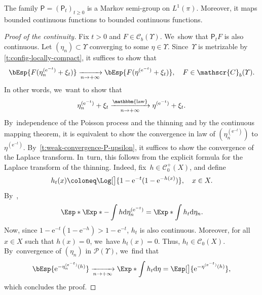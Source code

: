 \documentclass[JEP,XML,SOM,Unicode,published]{cedram}
\theoremstyle{definition}
\theoremstyle{remark}
\DeclareMathOperator{\law}{\mathbbm{law}}
\begin{document}
The family $\mathsf{P} = (\mathsf{P}_{t})_{t \ge 0}$ is a Markov semi-group on $L^{1}(\pi)$.
Moreover, it maps bounded continuous functions to bounded continuous functions.
\begin{proof}[Proof of the continuity]
Fix $t > 0$ and $F \in \mathscr{C}_{b}(\Upsilon)$. We~show that $\mathsf{P}_{t}F$ is also continuous.
Let $(\eta_{n}) \subset \varUpsilon$ converging to some $\eta \in \varUpsilon$.
Since~$\varUpsilon$ is metrizable by \cref{t:config-locally-compact}, it suffices to show that
\begin{equation*}
\bEsp{F(\eta_{n}^{(\mathrm{e}^{-t})} + \xi_{t})} \xrightarrow[n \to +\infty]{} \bEsp{F(\eta^{(\mathrm{e}^{-t})} + \xi_{t})}, \quad F \in \mathscr{C}_{b}(\varUpsilon).
\end{equation*}
In other words, we~want to show that
\begin{equation*}
\eta_{n}^{(\mathrm{e}^{-t})} + \xi_{t} \xrightarrow[n \to +\infty]{\law} \eta^{(\mathrm{e}^{-t})} + \xi_{t}.
\end{equation*}
By~independence of the Poisson process and the thinning and by the continuous mapping theorem, it is equivalent to show the convergence in law of $(\eta_{n}^{(\mathrm{e}^{-t})})$ to $\eta^{(\mathrm{e}^{-t})}$.
By~\cref{t:weak-convergence-P-upsilon}, it suffices to show the convergence of the Laplace transform.
In~turn, this follows from the explicit formula for the Laplace transform of the thinning.
Indeed, fix~$h \in \mathscr{C}_{0}^{+}(X)$, and define
\begin{equation*}
h_{t}(x) \coloneq \Log[\big]{ 1 - \mathrm{e}^{-t} (1-\mathrm{e}^{-h(x)})}, \quad x \in X.
\end{equation*}
By~\cite[Lem.\,3.1(iv)]{Kallenberg},
\begin{equation*}
\Esp*{ \Exp*{- \int h \mathrm{d} \eta_{n}^{(\mathrm{e}^{-t})}} } = \Exp*{ \int h_{t} \mathrm{d} \eta_{n} }.
\end{equation*}
Now, since $1 - \mathrm{e}^{-t}(1-\mathrm{e}^{-h}) > 1 - \mathrm{e}^{-t}$, $h_{t}$ is also continuous.
Moreover, for all $x \in X$ such that $h(x) = 0$, we~have $h_{t}(x) = 0$.
Thus, $h_{t} \in \mathscr{C}_{0}(X)$.
By~convergence of $(\eta_{n})$ in $\mathscr{P}(\varUpsilon)$, we~find that
\begin{equation*}
\bEsp{ \mathrm{e}^{- \eta_{n}^{(\mathrm{e}^{-t})}(h)} } \xrightarrow[n \to +\infty]{} \Exp*{ \int h_{t} \mathrm{d} \eta } = \Esp[\big]{ \mathrm{e}^{- \eta^{(\mathrm{e}^{-t})}(h)}},
\end{equation*}
which concludes the proof.
\end{proof}
\end{document}
